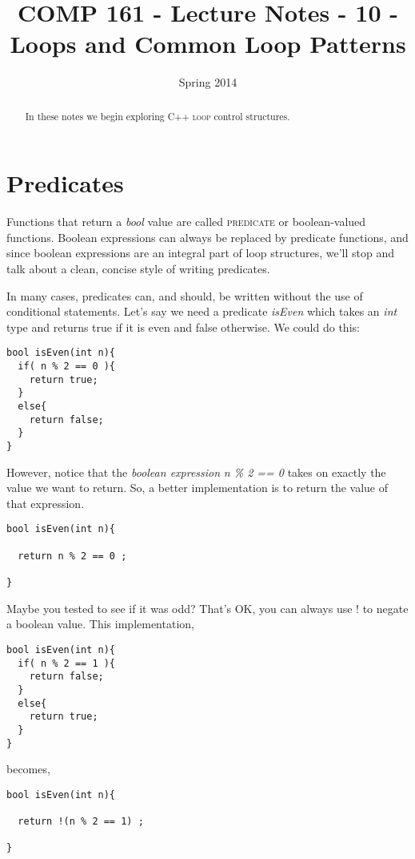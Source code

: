 \documentclass[]{tufte-handout}
\title{COMP 161 - Lecture Notes - 10 - Loops and Common Loop Patterns}
\date{Spring 2014}
\begin{document}
 
\maketitle

\begin{abstract}
In these notes we begin exploring C++ \textsc{loop} control structures.
\end{abstract}

\section{Predicates}

Functions that return a \textit{bool} value are called \textsc{predicate} or boolean-valued functions. Boolean expressions can always be replaced by predicate functions, and since boolean expressions are an integral part of loop structures, we'll stop and talk about a clean, concise style of writing predicates.

In many cases, predicates can, and should, be written without the use of conditional statements.  Let's say we need a predicate \textit{isEven} which takes an \textit{int} type and returns true if it is even and false otherwise.  We could do this:
\begin{verbatim}
bool isEven(int n){
  if( n % 2 == 0 ){
    return true;
  }
  else{
    return false;
  }
}
\end{verbatim}

However, notice that the \textit{boolean expression} \textit{n \% 2 == 0} takes on exactly the value we want to return. So, a better implementation is to return the value of that expression.
\begin{verbatim}
bool isEven(int n){
  
  return n % 2 == 0 ;

}
\end{verbatim}

Maybe you tested to see if it was odd?  That's OK, you can always use ! to negate a boolean value. This implementation,
\begin{verbatim}
bool isEven(int n){
  if( n % 2 == 1 ){
    return false;
  }
  else{
    return true;
  }
}
\end{verbatim}
becomes,
\begin{verbatim}
bool isEven(int n){
  
  return !(n % 2 == 1) ;

}
\end{verbatim}
\end{document}
